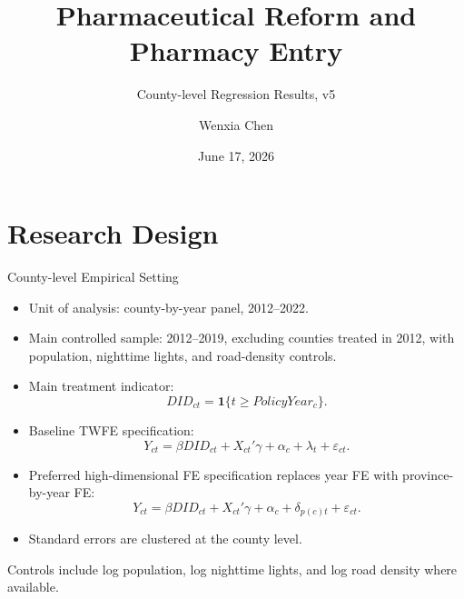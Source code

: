 \documentclass{beamer}
\title{Pharmaceutical Reform and Pharmacy Entry}
\subtitle{County-level Regression Results, v5}
\author{Wenxia Chen}
\date{June 17, 2026}
\begin{document}
\frame{\titlepage}


\section{Research Design}

\begin{frame}{County-level Empirical Setting}

\small
\begin{itemize}\setlength\itemsep{0.65em}
    \item Unit of analysis: county-by-year panel, 2012--2022.
    \item Main controlled sample: 2012--2019, excluding counties treated in 2012, with population, nighttime lights, and road-density controls.
    \item Main treatment indicator:
    \[
        DID_{ct} = \mathbf{1}\{t \geq PolicyYear_c\}.
    \]
    \item Baseline TWFE specification:
    \[
        Y_{ct}=\beta DID_{ct}+X_{ct}'\gamma+\alpha_c+\lambda_t+\varepsilon_{ct}.
    \]
    \item Preferred high-dimensional FE specification replaces year FE with province-by-year FE:
    \[
        Y_{ct}=\beta DID_{ct}+X_{ct}'\gamma+\alpha_c+\delta_{p(c)t}+\varepsilon_{ct}.
    \]
    \item Standard errors are clustered at the county level.
\end{itemize}

\vspace{0.3em}
\tiny Controls include log population, log nighttime lights, and log road density where available.

\end{frame}
\end{document}
